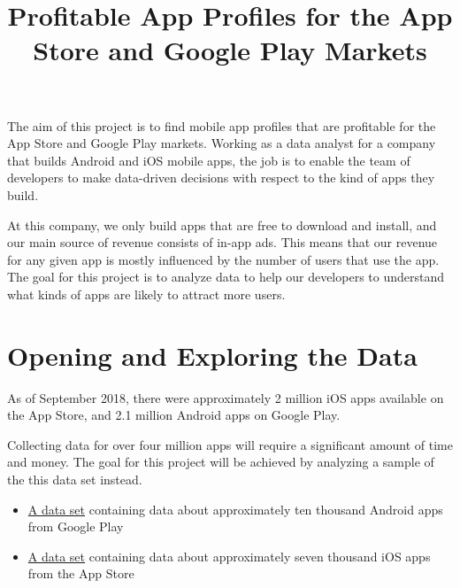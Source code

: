 \documentclass[11pt]{article}
\title{ Profitable App Profiles for the App Store and Google Play Markets}
\begin{document}
    
    
    \maketitle
    
    

    
    The aim of this project is to find mobile app profiles that are
profitable for the App Store and Google Play markets. Working as a data
analyst for a company that builds Android and iOS mobile apps, the job
is to enable the team of developers to make data-driven decisions with
respect to the kind of apps they build.

    At this company, we only build apps that are free to download and
install, and our main source of revenue consists of in-app ads. This
means that our revenue for any given app is mostly influenced by the
number of users that use the app. The goal for this project is to
analyze data to help our developers to understand what kinds of apps are
likely to attract more users.

    \section{Opening and Exploring the
Data}\label{opening-and-exploring-the-data}

    As of September 2018, there were approximately 2 million iOS apps
available on the App Store, and 2.1 million Android apps on Google Play.

    Collecting data for over four million apps will require a significant
amount of time and money. The goal for this project will be achieved by
analyzing a sample of the this data set instead.

    \begin{itemize}
\item
  \href{https://www.kaggle.com/lava18/google-play-store-apps/home}{A
  data set} containing data about approximately ten thousand Android
  apps from Google Play
\item
  \href{https://www.kaggle.com/ramamet4/app-store-apple-data-set-10k-apps/home}{A
  data set} containing data about approximately seven thousand iOS apps
  from the App Store
\end{itemize}
\end{document}
